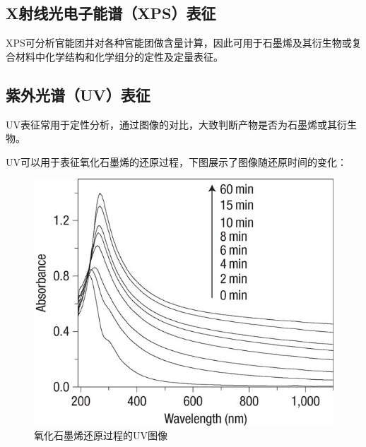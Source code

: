 \subsection{X射线光电子能谱（XPS）表征}

XPS可分析官能团并对各种官能团做含量计算，因此可用于石墨烯及其衍生物或复合材料中化学结构和化学组分的定性及定量表征。



\subsection{紫外光谱（UV）表征}

UV表征常用于定性分析，通过图像的对比，大致判断产物是否为石墨烯或其衍生物。

UV可以用于表征氧化石墨烯的还原过程，下图展示了图像随还原时间的变化\cite{RN33}：

\begin{figure}
    \centering
    \includegraphics[scale=0.4]{img/UV}
    \caption{氧化石墨烯还原过程的UV图像}
\end{figure}